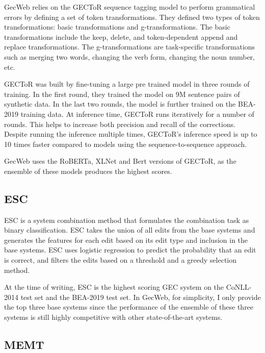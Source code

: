 GecWeb relies on the GECToR sequence tagging model to perform grammatical errors by defining a set of token transformations.
They defined two types of token transformations: basic transformations and g-transformations.
The basic transformations include the keep, delete, and token-dependent append and replace transformations.
The g-transformations are task-specific transformations such as merging two words, changing the verb form, changing the noun number, etc.

GECToR was built by fine-tuning a large pre trained model in three rounds of training.
In the first round, they trained the model on 9M sentence pairs of synthetic data.
In the last two rounds, the model is further trained on the BEA-2019 training data.
At inference time, GECToR runs iteratively for a number of rounds.
This helps to increase both precision and recall of the corrections.
Despite running the inference multiple times, GECToR's inference speed is up to 10 times faster compared to models using the sequence-to-sequence approach.

GecWeb uses the RoBERTa, XLNet and Bert versions of GECToR, as the ensemble of these models produces the highest scores.

\subsection{ESC}
\label{esc}

ESC is a system combination method that formulates the combination task as binary classification.
ESC takes the union of all edits from the base systems and generates the features for each edit based on its edit type and inclusion in the base systems.
ESC uses logistic regression to predict the probability that an edit is correct, and filters the edits based
on a threshold and a greedy selection method.

At the time of writing, ESC is the highest scoring GEC system on the CoNLL-2014 test set and the BEA-2019 test set.
In GecWeb, for simplicity, I only provide the top three base systems since the performance of the
ensemble of these three systems is still highly competitive with other state-of-the-art systems.

\subsection{MEMT}
\label{memt}

